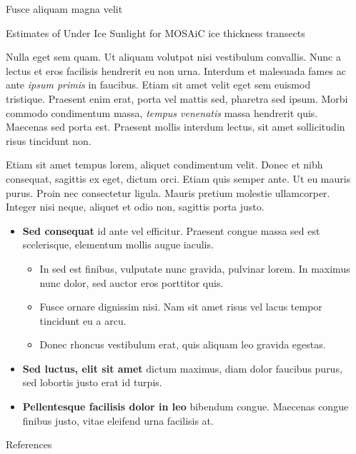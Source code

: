 \documentclass[final]{beamer}
\newlength{\sepwidth}
\newlength{\colwidth}
\newcommand{\separatorcolumn}{\begin{column}{\sepwidth}\end{column}}
\begin{document}
\begin{frame}[t,fragile]
\begin{columns}[t]
\begin{column}{\colwidth}
\begin{block}{Fusce aliquam magna velit}
  \end{block}

  \begin{block}{Estimates of Under Ice Sunlight for MOSAiC ice thickness transects}

    Nulla eget sem quam. Ut aliquam volutpat nisi vestibulum convallis. Nunc a
    lectus et eros facilisis hendrerit eu non urna. Interdum et malesuada fames
    ac ante \textit{ipsum primis} in faucibus. Etiam sit amet velit eget sem
    euismod tristique. Praesent enim erat, porta vel mattis sed, pharetra sed
    ipsum. Morbi commodo condimentum massa, \textit{tempus venenatis} massa
    hendrerit quis. Maecenas sed porta est. Praesent mollis interdum lectus,
    sit amet sollicitudin risus tincidunt non.

    Etiam sit amet tempus lorem, aliquet condimentum velit. Donec et nibh
    consequat, sagittis ex eget, dictum orci. Etiam quis semper ante. Ut eu
    mauris purus. Proin nec consectetur ligula. Mauris pretium molestie
    ullamcorper. Integer nisi neque, aliquet et odio non, sagittis porta justo.

    \begin{itemize}
      \item \textbf{Sed consequat} id ante vel efficitur. Praesent congue massa
        sed est scelerisque, elementum mollis augue iaculis.
        \begin{itemize}
          \item In sed est finibus, vulputate
            nunc gravida, pulvinar lorem. In maximus nunc dolor, sed auctor eros
            porttitor quis.
          \item Fusce ornare dignissim nisi. Nam sit amet risus vel lacus
            tempor tincidunt eu a arcu.
          \item Donec rhoncus vestibulum erat, quis aliquam leo
            gravida egestas.
        \end{itemize}
      \item \textbf{Sed luctus, elit sit amet} dictum maximus, diam dolor
        faucibus purus, sed lobortis justo erat id turpis.
      \item \textbf{Pellentesque facilisis dolor in leo} bibendum congue.
        Maecenas congue finibus justo, vitae eleifend urna facilisis at.
    \end{itemize}

  \end{block}

  
  \begin{block}{References}

    \nocite{*}
    \footnotesize{}

  \end{block}

\end{column}
\separatorcolumn



\end{columns}
\end{frame}
\end{document}
